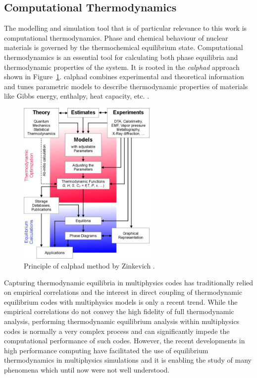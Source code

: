 \subsection{Computational Thermodynamics}
    The modelling and simulation tool that is of particular relevance to this work is computational thermodynamics. Phase and chemical behaviour of nuclear materials is governed by the thermochemical equilibrium state. Computational thermodynamics is an essential tool for calculating both phase equilibria and thermodynamic properties of the system. It is rooted in the \emph{\gls{calphad}} approach shown in Figure~\ref{fig:calphad}. \gls{calphad} combines experimental and theoretical information and tunes parametric models to describe thermodynamic properties of materials like Gibbs energy, enthalpy, heat capacity, etc. \cite{Lukas07}.
	\begin{figure}[htb]
		\centering
		\includegraphics[width=0.6\textwidth]{figures/chapter-1/Calphad_method}
		\caption[Principle of CALPHAD method]{Principle of \gls{calphad} method by Zinkevich \cite{Zinkevich:2003aa}.}
		\label{fig:calphad}
	\end{figure}

	Capturing thermodynamic equilibria in multiphysics codes has traditionally relied on empirical correlations and the interest in direct coupling of thermodynamic equilibrium codes with multiphysics models is only a recent trend. While the empirical correlations do not convey the high fidelity of full thermodynamic analysis, performing thermodynamic equilibrium analysis within multiphysics codes is normally a very complex process and can significantly impede the computational performance of such codes. However, the recent developments in high performance computing have facilitated the use of equilibrium thermodynamics in multiphysics  simulations and it is enabling the study of many phenomena which until now were not well understood.
	
